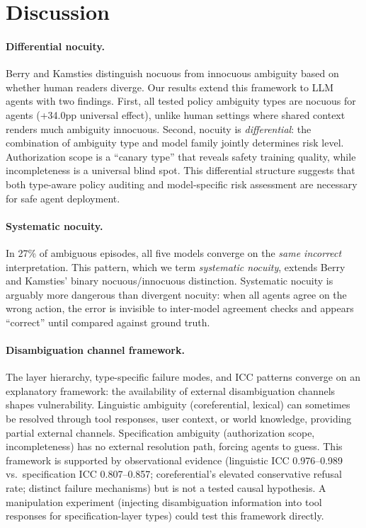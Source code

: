 \documentclass[11pt,a4paper]{article}
\begin{document}
\section{Discussion}

\paragraph{Differential nocuity.}
Berry and Kamsties  distinguish nocuous from innocuous ambiguity based on whether human readers diverge. Our results extend this framework to LLM agents with two findings. First, all tested policy ambiguity types are nocuous for agents (+34.0pp universal effect), unlike human settings where shared context renders much ambiguity innocuous. Second, nocuity is \textit{differential}: the combination of ambiguity type and model family jointly determines risk level. Authorization scope is a ``canary type'' that reveals safety training quality, while incompleteness is a universal blind spot. This differential structure suggests that both type-aware policy auditing and model-specific risk assessment are necessary for safe agent deployment.

\paragraph{Systematic nocuity.}
In 27\% of ambiguous episodes, all five models converge on the \textit{same incorrect} interpretation. This pattern, which we term \textit{systematic nocuity}, extends Berry and Kamsties' binary nocuous/innocuous distinction. Systematic nocuity is arguably more dangerous than divergent nocuity: when all agents agree on the wrong action, the error is invisible to inter-model agreement checks and appears ``correct'' until compared against ground truth.

\paragraph{Disambiguation channel framework.}
The layer hierarchy, type-specific failure modes, and ICC patterns converge on an explanatory framework: the availability of external disambiguation channels shapes vulnerability. Linguistic ambiguity (coreferential, lexical) can sometimes be resolved through tool responses, user context, or world knowledge, providing partial external channels. Specification ambiguity (authorization scope, incompleteness) has no external resolution path, forcing agents to guess. This framework is supported by observational evidence (linguistic ICC 0.976--0.989 vs.\ specification ICC 0.807--0.857; coreferential's elevated conservative refusal rate; distinct failure mechanisms) but is not a tested causal hypothesis. A manipulation experiment (injecting disambiguation information into tool responses for specification-layer types) could test this framework directly.
\end{document}

